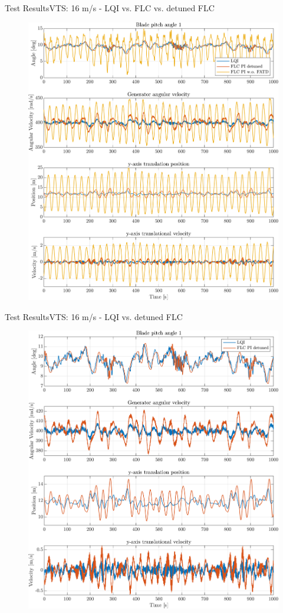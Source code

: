 

\begin{frame}{Test Results}{VTS: 16 m/s - LQI vs. FLC vs. detuned FLC}
	\begin{figure}[h]
		\centering
		\includegraphics[width=0.7\linewidth]{../Graphics/TestResults/VTSplotting/3_th_w_py_vy.png}
		\label{fig:vts_3_th_w_py_vy}
	\end{figure}
\end{frame}



\begin{frame}{Test Results}{VTS: 16 m/s - LQI vs. detuned FLC}
	\begin{figure}[h]
		\centering
		\includegraphics[width=0.7\linewidth]{../Graphics/TestResults/VTSplotting/10_th_w_py_vy.png}
		\label{fig:vts_10_th_w_py_vy}
	\end{figure}
\end{frame}


